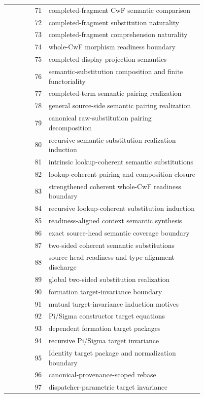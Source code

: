 \documentclass[11pt]{article}
\theoremstyle{definition}
\begin{document}
\begin{center}\scriptsize
\begin{tabular}{@{}r p{0.79\linewidth}@{}}
\toprule
71 & completed-fragment CwF semantic comparison \\
72 & completed-fragment substitution naturality \\
73 & completed-fragment comprehension naturality \\
74 & whole-CwF morphism readiness boundary \\
75 & completed display-projection semantics \\
76 & semantic-substitution composition and finite functoriality \\
77 & completed-term semantic pairing realization \\
78 & general source-side semantic pairing realization \\
79 & canonical raw-substitution pairing decomposition \\
80 & recursive semantic-substitution realization induction \\
81 & intrinsic lookup-coherent semantic substitutions \\
82 & lookup-coherent pairing and composition closure \\
83 & strengthened coherent whole-CwF readiness boundary \\
84 & recursive lookup-coherent substitution induction \\
85 & readiness-aligned context semantic synthesis \\
86 & exact source-head semantic coverage boundary \\
87 & two-sided coherent semantic substitutions \\
88 & source-head readiness and type-alignment discharge \\
89 & global two-sided substitution realization \\
90 & formation target-invariance boundary \\
91 & mutual target-invariance induction motives \\
92 & Pi/Sigma constructor target equations \\
93 & dependent formation target packages \\
94 & recursive Pi/Sigma target invariance \\
95 & Identity target package and normalization boundary \\
96 & canonical-provenance-scoped rebase \\
97 & dispatcher-parametric target invariance \\

\end{tabular}
\end{center}
\end{document}
